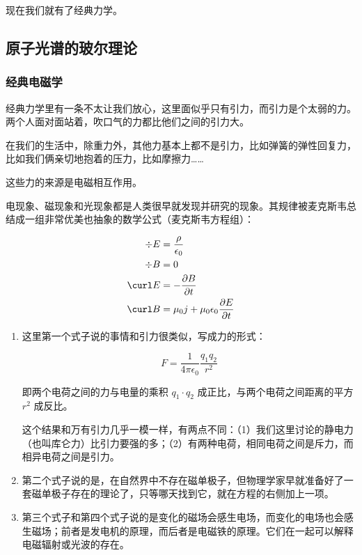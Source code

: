 现在我们就有了经典力学。

\subsection{原子光谱的玻尔理论}

\subsubsection{经典电磁学}

经典力学里有一条不太让我们放心，这里面似乎只有引力，而引力是个太弱的力。两个人面对面站着，吹口气的力都比他们之间的引力大。

在我们的生活中，除重力外，其他力基本上都不是引力，比如弹簧的弹性回复力，比如我们俩亲切地抱着的压力，比如摩擦力……

这些力的来源是电磁相互作用。

电现象、磁现象和光现象都是人类很早就发现并研究的现象。其规律被麦克斯韦总结成一组非常优美也抽象的数学公式（麦克斯韦方程组）：

\begin{equation}
\begin{aligned}
\div E & = \frac{\rho}{ \epsilon_0}\\
\div B & = 0 \\
\curl E & = - \frac{\partial B}{\partial t} \\
\curl B & = \mu_0 j + \mu_0 \epsilon_0 \frac{\partial E}{\partial t}
\end{aligned}
\end{equation}


\begin{enumerate}
\item 

这里第一个式子说的事情和引力很类似，写成力的形式：

\begin{equation}
F = \frac{1}{4 \pi \epsilon_0} \frac{q_1 q_2}{r^2}
\end{equation}

即两个电荷之间的力与电量的乘积 $q_1 \cdot q_2$ 成正比，与两个电荷之间距离的平方 $r^2$ 成反比。

这个结果和万有引力几乎一模一样，有两点不同：（1）我们这里讨论的静电力（也叫库仑力）比引力要强的多；（2）有两种电荷，相同电荷之间是斥力，而相异电荷之间是引力。

\item

第二个式子说的是，在自然界中不存在磁单极子，但物理学家早就准备好了一套磁单极子存在的理论了，只等哪天找到它，就在方程的右侧加上一项。

\item

第三个式子和第四个式子说的是变化的磁场会感生电场，而变化的电场也会感生磁场；前者是发电机的原理，而后者是电磁铁的原理。它们在一起可以解释电磁辐射或光波的存在。

\end{enumerate}

